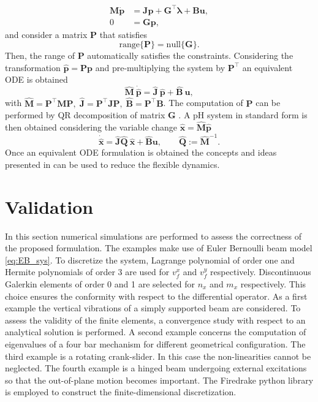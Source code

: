 \documentclass{svjour3}                     %
\newcommand{\secondRev}[1]{\textcolor{blue!80!black}{#1}}
\begin{document}
	\begin{equation}
	\begin{aligned}
	\mathbf{M} \dot{\mathbf{p}} &=  \mathbf{J}\mathbf{p} + \mathbf{G}^\top \bm{\lambda} + \mathbf{B}\mathbf{u}, \\ 
	0 &= \mathbf{G}\mathbf{p},
	\end{aligned}
	\end{equation}
	and consider a matrix $\mathbf{P}$ that satisfies 
	\[
	\mathrm{range}\{\mathbf{P}\} = \mathrm{null}\{\mathbf{G}\}.
	\]
	Then, the range of $\mathbf{P}$ automatically satisfies the constraints. Considering the transformation $\widehat{\mathbf{p}} = \mathbf{P} \mathbf{p}$ and pre-multiplying the system by $\mathbf{P}^\top$ an equivalent ODE is obtained
	\[
	\widehat{\mathbf{M}} \ \dot{\widehat{\mathbf{p}}} =  \widehat{\mathbf{J}} \ \widehat{\mathbf{p}} + \widehat{\mathbf{B}} \ \mathbf{u},
	\]
	with $\widehat{\mathbf{M}} = \mathbf{P}^\top \mathbf{M} \mathbf{P}, \; \widehat{\mathbf{J}} = \mathbf{P}^\top \mathbf{J} \mathbf{P}, \; \widehat{\mathbf{B}} = \mathbf{P}^\top \mathbf{B}$. The computation of $\mathbf{P}$ can be performed by QR decomposition of matrix $\mathbf{G}$ \cite{nullspaceFlMult}. A pH system in standard form is then obtained considering the variable change $\widehat{\mathbf{x}} = \widehat{\mathbf{M}} \widehat{\mathbf{p}}$
	\[ \dot{\widehat{\mathbf{x}}} =  \widehat{\mathbf{J}} \widehat{\mathbf{Q}}\ \widehat{\mathbf{x}} + \widehat{\mathbf{B}}  \mathbf{u}, \qquad \widehat{\mathbf{Q}}:= \widehat{\mathbf{M}}^{-1}.
	\] 
	Once an equivalent ODE formulation is obtained the concepts and ideas presented in \cite{phode_red} can be used to reduce the flexible dynamics.
	
	\section{Validation}
	\label{sec:valid}
	In this section numerical simulations are performed to assess the correctness of the proposed formulation. \secondRev{The examples make use of Euler Bernoulli beam model \eqref{eq:EB_sys}. To discretize the system, Lagrange polynomial of order one and Hermite polynomials of order 3 are used for $v_f^x$ and $v_f^y$ respectively. Discontinuous Galerkin elements of order 0 and 1 are selected for $n_x$ and $m_{x}$ respectively. This choice ensures the conformity with respect to the differential operator. As a first example the vertical vibrations of a simply supported beam are considered. To assess the validity of the finite elements, a convergence study with respect to an analytical solution is performed}. A \secondRev{second} example concerns the computation of eigenvalues of a four bar \secondRev{mechanism} for different geometrical configuration. The \secondRev{third} example is a rotating crank-slider. In this case the non-linearities cannot be neglected. The \secondRev{fourth} example is a hinged beam undergoing external excitations so that the out-of-plane motion becomes important.  The Firedrake python library \cite{rathgeber2017firedrake} is employed to construct the finite-dimensional discretization.  
	
\end{document}

